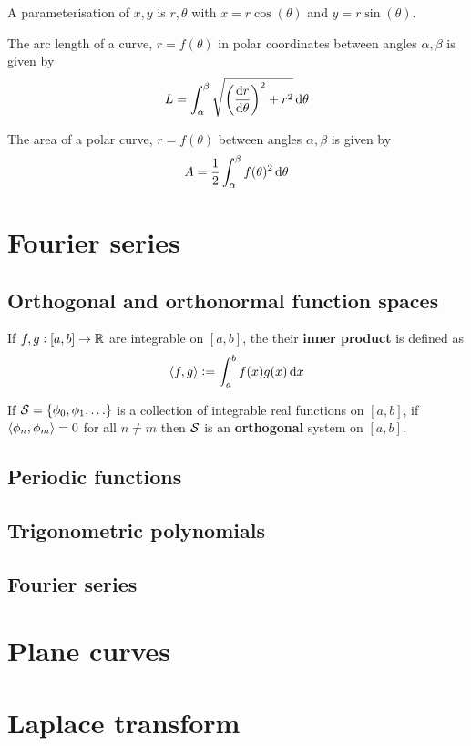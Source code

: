 \documentclass[../Year1/Year1.tex]{subfiles}
\begin{document}
\begin{definition}
    A parameterisation of $x,y$ is $r,\theta$ with $x=r\cos(\theta)$ and $y=r\sin(\theta)$.
\end{definition}

\begin{theorem}
    The arc length of a curve, $r=f(\theta)$ in polar coordinates between angles $\alpha,\beta$ is given by \[
        L = \intd{\alpha}{\beta}{\sqrt{\br{\frac{\dif r}{\dif \theta}}^2 + r^2}}{\theta}
    \]
\end{theorem}

\begin{theorem}
    The area of a polar curve, $r=f(\theta)$ between angles $\alpha,\beta$ is given by \[
        A = \frac{1}{2}\intd{\alpha}{\beta}{f(\theta)^2}{\theta}
    \]
\end{theorem}

\section{Fourier series}
\subsection{Orthogonal and orthonormal function spaces}

\begin{definition}
    If $f,g:[a,b]\rightarrow\mathbb{R}$ are integrable on $[a,b]$, the their \textbf{inner product} is defined as \[
        \abr{f,g} := \intd{a}{b}{f(x)g(x)}{x}
    \] 
\end{definition}

\begin{definition}
    If $\mathcal{S}=\{\phi_0,\phi_1,\ldots\}$ is a collection of integrable real functions on $[a,b]$, if $\left\langle \phi_n,\phi_m \right\rangle=0$ for all $n\neq m$ then $\mathcal{S}$ is an \textbf{orthogonal} system on $[a,b]$.
\end{definition}

\subsection{Periodic functions}
\subsection{Trigonometric polynomials}
\subsection{Fourier series}

\section{Plane curves}

\section{Laplace transform}
\end{document}
